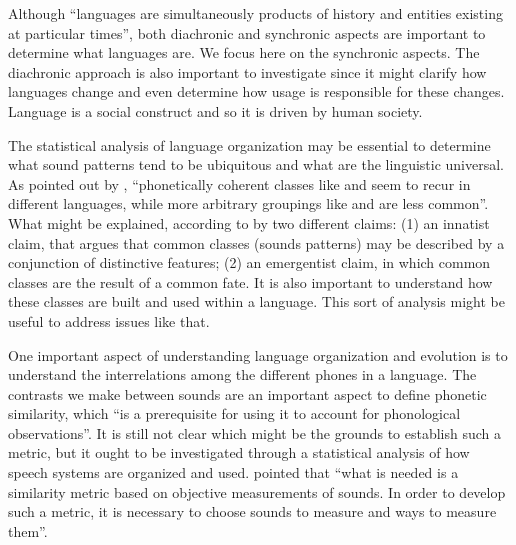 
Although ``languages are simultaneously products of history and entities existing at particular times''\citep{good2008},
both diachronic and synchronic aspects are important to determine what languages are. We focus here on the
synchronic aspects. %
The diachronic approach is also important to investigate since it might clarify 
how languages change and even determine how usage is responsible for these changes. 
Language is a social construct and so it is driven by human society.

The statistical analysis of language organization may be essential to determine what sound patterns tend to be 
ubiquitous and what are the linguistic universal.
As pointed out by \cite{mielke2005}, ``phonetically coherent classes like  and  
seem to recur in different languages, while more arbitrary groupings like  and 
 are less common''. What might be explained, according to \cite{mielke2005} 
by two different claims: (1) an innatist claim, that argues that common classes (sounds patterns) may be described 
by a conjunction of distinctive features; (2) an emergentist claim, in which common classes are the result of a 
common fate. It is also important to understand how these classes are built and used within a language. 
This sort of analysis might be useful to address issues like that.

One important aspect of understanding language organization and evolution is to understand the 
interrelations among the different phones in a language.
The contrasts we make between sounds are an important aspect to define phonetic similarity, which 
``is a prerequisite for using it to account for phonological observations''\citep{mielke2005}. 
It is still not clear which might be the grounds to establish such a metric, but it ought to be investigated 
through a statistical analysis of how speech systems are organized and used. 
\cite{mielke2005} pointed that ``what is needed is a similarity metric based on objective measurements of sounds. 
In order to develop such a metric, it is necessary to choose sounds to measure and ways to measure them''.

